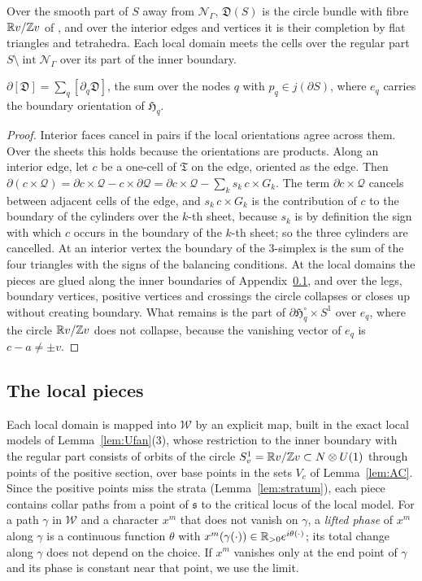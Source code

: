 Over the smooth part of $S$ away from $\mathcal N_\Gamma$, $\mathfrak D(S)$ is the circle bundle with fibre $\mathbb R v/\mathbb Z v$ of
\cite[\S7]{CBM}, and over the interior edges and vertices it is their completion by flat triangles and tetrahedra. Each local
domain meets the cells over the regular part $S\setminus\operatorname{int}\mathcal N_\Gamma$ over its part of the inner boundary.

\begin{lemma}\label{lem:domain}
$\partial[\mathfrak D]=\sum_q[\partial_q\mathfrak D]$, the sum over the nodes $q$ with $p_q\in j(\partial S)$, where $e_q$
carries the boundary orientation of $\mathfrak H_q$.
\end{lemma}
\begin{proof}
Interior faces cancel in pairs if the local orientations agree across them. Over the sheets this holds because the
orientations are products. Along an interior edge, let $c$ be a one-cell of $\mathfrak T$ on the edge, oriented as the edge.
Then $\partial(c\times\mathcal Q)=\partial c\times\mathcal Q-c\times\partial\mathcal Q=\partial c\times\mathcal Q-\sum_ks_k\,c\times
G_k$. The term $\partial c\times\mathcal Q$ cancels between adjacent cells of the edge, and $s_k\,c\times G_k$ is the
contribution of $c$ to the boundary of the cylinders over the $k$-th sheet, because $s_k$ is by definition the sign with which
$c$ occurs in the boundary of the $k$-th sheet; so the three cylinders are cancelled. At an interior vertex the boundary of the
$3$-simplex is the sum of the four triangles with the signs of the balancing conditions. At the local domains the pieces are
glued along the inner boundaries of Appendix~\ref{ssec:res-local}, and over the legs, boundary vertices, positive vertices and
crossings the circle collapses or closes up without creating boundary. What remains is the part of
$\partial\mathfrak H^\circ_q\times S^1$ over $e_q$, where the circle $\mathbb R v/\mathbb Z v$ does not collapse, because the vanishing vector
of $e_q$ is $c-a\neq\pm v$.
\end{proof}

\subsection{The local pieces}\label{ssec:res-local}
Each local domain is mapped into $\mathscr W$ by an explicit map, built in the exact local models of Lemma~\ref{lem:Ufan}(3), whose
restriction to the inner boundary with the regular part consists of orbits of the circle $S^1_v=\mathbb R v/\mathbb Z v\subset N\otimes U(1)$
through points of the positive section, over base points in the sets $V_c$ of Lemma~\ref{lem:AC}. Since the positive points
miss the strata (Lemma~\ref{lem:stratum}), each piece contains collar paths from a point of $\mathfrak s$ to the critical locus
of the local model. For a path $\gamma$ in $\mathscr W$ and a character $x^m$ that does not vanish on $\gamma$, a \emph{lifted phase} of
$x^m$ along $\gamma$ is a continuous function $\theta$ with $x^m(\gamma(\cdot))\in\mathbb R_{>0}e^{i\theta(\cdot)}$; its total change
along $\gamma$ does not depend on the choice. If $x^m$ vanishes only at the end point of $\gamma$ and its phase is constant near
that point, we use the limit.

